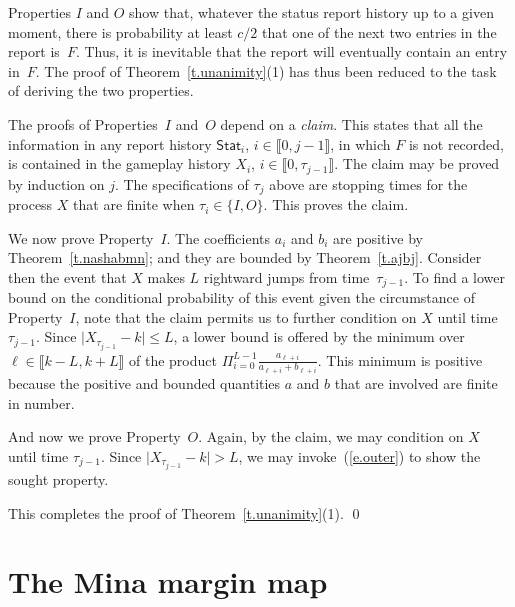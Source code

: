 \documentclass[letterpaper,11pt,oneside,reqno]{amsbook}
\numberwithin{figure}{chapter}
\theoremstyle{definition}
\theoremstyle{definition}
\theoremstyle{definition}
\theoremstyle{definition}
\theoremstyle{definition}
\newcommand{\status}{\mathsf{Stat}}
\newcommand{\minamm}{\mathcal{M}}
\begin{document}
Properties $I$ and $O$ show that, whatever the status report history up to a given moment, there is probability at least $c/2$ that one of the next two entries in the report is~$F$. Thus, it is inevitable that the report will eventually contain an entry in~$F$. The proof of Theorem~\ref{t.unanimity}(1) has thus been reduced to the task of deriving the two properties.

The proofs of Properties~$I$ and~$O$ depend on a {\em claim}. This states that all the information in any report history   $\status_i$, $i \in \llbracket 0,j-1\rrbracket$, in which $F$ is not recorded, is contained in the gameplay history 
$X_i$, $i \in \llbracket 0,\tau_{j-1} \rrbracket$. The claim may be proved by induction on $j$. The specifications of $\tau_j$ above are stopping times for the process $X$ that are finite when $\tau_i \in \{ I,O\}$. This proves the claim.

We now prove Property~$I$. The coefficients $a_i$ and $b_i$ are positive by Theorem~\ref{t.nashabmn}; and they are bounded by Theorem~\ref{t.ajbj}. Consider then the event that $X$ makes 
$L$ rightward jumps from time~$\tau_{j-1}$. To find a lower bound on the conditional probability of this event given the circumstance of Property~$I$, note that the claim permits us to further condition on $X$ until time $\tau_{j-1}$. Since $\vert X_{\tau_{j-1}} - k \vert \leq L$, a lower bound is offered by the minimum over $\ell \in \llbracket k-L,k+L \rrbracket$ of the product $\Pi_{i=0}^{L-1} \tfrac{a_{\ell+i}}{a_{\ell + i} + b_{\ell + i}}$. This minimum is positive because the positive and bounded quantities $a$ and $b$ that are involved are finite in number. 

And now we prove Property~$O$. Again, by the claim, we may condition on $X$ until time $\tau_{j-1}$. Since $\vert X_{\tau_{j-1}} - k \vert > L$, we may invoke~(\ref{e.outer}) to show the sought property.

This completes the proof of Theorem~\ref{t.unanimity}(1). \qed
  
 

  
\chapter{The Mina margin map}\label{c.allminamm}

\end{document}
